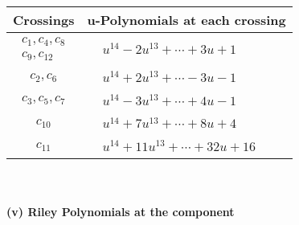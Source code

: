 \documentclass[1p]{elsarticle_modified}
\theoremstyle{definition}
\begin{document}
\begin{tabular}{m{50pt}|m{274pt}}
Crossings & \hspace{64pt}u-Polynomials at each crossing \\
\hline $$\begin{aligned}c_{1},c_{4},c_{8}\\c_{9},c_{12}\end{aligned}$$&$\begin{aligned}
&u^{14}-2 u^{13}+\cdots+3 u+1
\end{aligned}$\\
\hline $$\begin{aligned}c_{2},c_{6}\end{aligned}$$&$\begin{aligned}
&u^{14}+2 u^{13}+\cdots-3 u-1
\end{aligned}$\\
\hline $$\begin{aligned}c_{3},c_{5},c_{7}\end{aligned}$$&$\begin{aligned}
&u^{14}-3 u^{13}+\cdots+4 u-1
\end{aligned}$\\
\hline $$\begin{aligned}c_{10}\end{aligned}$$&$\begin{aligned}
&u^{14}+7 u^{13}+\cdots+8 u+4
\end{aligned}$\\
\hline $$\begin{aligned}c_{11}\end{aligned}$$&$\begin{aligned}
&u^{14}+11 u^{13}+\cdots+32 u+16
\end{aligned}$\\
\hline
\end{tabular}\\~\\
\newpage\renewcommand{\arraystretch}{1}
\flushleft \textbf{(v) Riley Polynomials at the component}\newline \\
\end{document}
